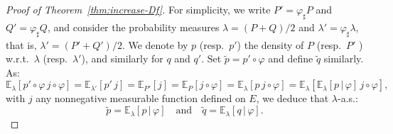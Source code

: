 \documentclass[12pt]{article}
\newcommand{\E}{{\mathbb E}}
\theoremstyle{plain}
\theoremstyle{remark}
\begin{document}
\begin{proof}[Proof of Theorem~\ref{thm:increase-Df}]
For simplicity, we write  $P'=\varphi_\sharp P$ and $Q'=\varphi_\sharp
Q$, and consider the probability measures
$\lambda=(P+Q)/2$ and $\lambda'=\varphi_\sharp \lambda$, that is,
$\lambda'=(P'+Q')/2$. We denote by $p$  (resp.\ $p'$)
the density of $P$  (resp.\ $P'$ ) w.r.t.\ $\lambda$
(resp.\ $\lambda'$), and similarly for $q$ and $q'$.
 Set  $\tilde p=p'\circ \varphi$ and define $\tilde q$ similarly. As:
\[
     \E_\lambda[p'\circ \varphi\, j\circ \varphi]
    =\E_{\lambda'}[p' \, j]=\E_{P'}[j]=\E_P[j\circ
    \varphi]=\E_\lambda[p\, j\circ
    \varphi]=\E_\lambda[\E_\lambda[p\, |\, \varphi] \, j\circ \varphi],
    \]
 with $j$ any nonnegative measurable function defined on $E$, we deduce
 that $\lambda$-a.s.:
\[
  \tilde p =\E_\lambda[p\,
  |\, \varphi]
  \quad\text{and}\quad
  \tilde q =\E_\lambda[q\,
  |\, \varphi].
\]




\end{proof}
\end{document}
